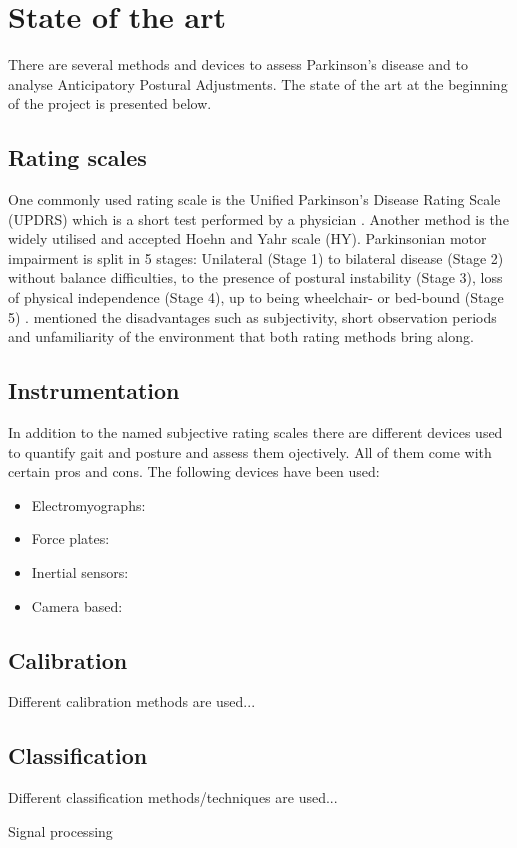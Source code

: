 \section{State of the art}

There are several methods and devices to assess Parkinson's disease and to analyse Anticipatory Postural Adjustments. The state of the art at the beginning of the project is presented below.

\subsection{Rating scales}

One commonly used rating scale is the Unified Parkinson’s Disease Rating Scale (UPDRS) which is a short test performed by a physician \cite{klerk_long-term_2009}. Another method is the widely utilised and accepted Hoehn and Yahr scale (HY). Parkinsonian motor impairment is split in 5 stages: Unilateral (Stage 1) to bilateral disease (Stage 2) without balance difficulties, to the presence of postural instability (Stage 3), loss of physical independence (Stage 4), up to being wheelchair- or bed-bound (Stage 5) \cite{goetz_movement_2004}. \citeauthor{klerk_long-term_2009} \cite{klerk_long-term_2009} mentioned the disadvantages such as subjectivity, short observation periods and unfamiliarity of the environment that both rating methods bring along.

\subsection{Instrumentation}

In addition to the named subjective rating scales there are different devices used to quantify gait and posture and assess them ojectively. All of them come with certain pros and cons. The following devices have been used:

\begin{itemize}

\item Electromyographs:

\item Force plates:

\item Inertial sensors:

\item Camera based:

\end{itemize}

\subsection{Calibration}

Different calibration methods are used...


\subsection{Classification}

Different classification methods/techniques are used...

Signal processing

